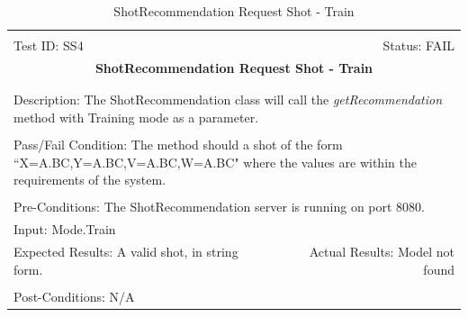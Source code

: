 \documentclass[11pt]{article}
\begin{document}
\begin{center}
\begin{table}[H]
\begin{tabular}{|l r|}\hline&\\[-2mm]
	Test ID: SS4	&Status: FAIL\\[-3mm]
	\multicolumn{2}{|c|}{\textbf{\large{ShotRecommendation Request Shot - Train}}}\\&\\\hline&\\[-3mm]
	\multicolumn{2}{|p{\textwidth}|}{Description: The ShotRecommendation class will call the \textit{getRecommendation} method with Training mode as a parameter.}\\[1mm]\hline&\\[-3mm]
	\multicolumn{2}{|p{\textwidth}|}{Pass/Fail Condition: The method should a shot of the form ``X=A.BC,Y=A.BC,V=A.BC,W=A.BC" where the values are within the requirements of the system.}\\[1mm]\hline&\\[-3mm]
	\multicolumn{2}{|p{\textwidth}|}{Pre-Conditions: The ShotRecommendation server is running on port 8080.}\\[4mm]
	\multicolumn{2}{|p{\textwidth}|}{Input: Mode.Train}\\[2mm]\hline
	\multicolumn{1}{|p{0.49\textwidth}}{Expected Results: A valid shot, in string form.}	&\multicolumn{1}{|p{0.45\textwidth}|}{Actual Results: Model not found}\\\hline&\\[-3mm]
	\multicolumn{2}{|p{\textwidth}|}{Post-Conditions: N/A}\\\hline
\end{tabular}
\caption{ShotRecommendation Request Shot - Train}
\end{table}
\end{center}
\end{document}
